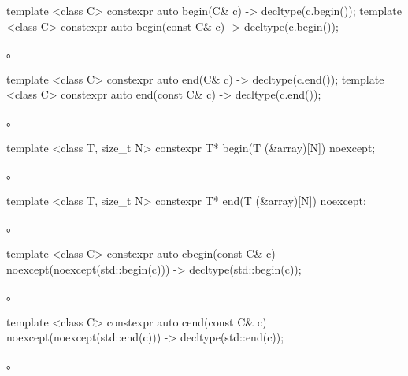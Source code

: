 %
\begin{itemdecl}
template <class C> constexpr auto begin(C& c) -> decltype(c.begin());
template <class C> constexpr auto begin(const C& c) -> decltype(c.begin());
\end{itemdecl}

\begin{itemdescr}
\pnum
\returns {}。
\end{itemdescr}

%
\begin{itemdecl}
template <class C> constexpr auto end(C& c) -> decltype(c.end());
template <class C> constexpr auto end(const C& c) -> decltype(c.end());
\end{itemdecl}

\begin{itemdescr}
\pnum
\returns {}。
\end{itemdescr}

%
\begin{itemdecl}
template <class T, size_t N> constexpr T* begin(T (&array)[N]) noexcept;
\end{itemdecl}

\begin{itemdescr}
\pnum
\returns {}。
\end{itemdescr}

%
\begin{itemdecl}
template <class T, size_t N> constexpr T* end(T (&array)[N]) noexcept;
\end{itemdecl}

\begin{itemdescr}
\pnum
\returns {}。
\end{itemdescr}

%
\begin{itemdecl}
template <class C> constexpr auto cbegin(const C& c) noexcept(noexcept(std::begin(c)))
  -> decltype(std::begin(c));
\end{itemdecl}
\begin{itemdescr}
\pnum \returns {}。
\end{itemdescr}

%
\begin{itemdecl}
template <class C> constexpr auto cend(const C& c) noexcept(noexcept(std::end(c)))
  -> decltype(std::end(c));
\end{itemdecl}
\begin{itemdescr}
\pnum \returns {}。
\end{itemdescr}

